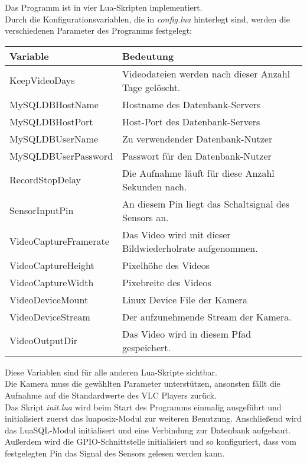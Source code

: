 Das Programm ist in vier Lua-Skripten implementiert.\\
Durch die Konfigurationsvariablen, die in \textit{config.lua} hinterlegt sind, werden die verschiedenen Parameter des Programms festgelegt:
\begin{center}
\begin{tabular}{|l|l|}
     \hline
     \textbf{Variable} & \textbf{Bedeutung} \\ \hline \hline
     KeepVideoDays & Videodateien werden nach dieser Anzahl Tage gel\"oscht.  \\ \hline
     MySQLDBHostName & Hostname des Datenbank-Servers \\ \hline
     MySQLDBHostPort & Host-Port des Datenbank-Servers \\ \hline
     MySQLDBUserName & Zu verwendender Datenbank-Nutzer \\ \hline
     MySQLDBUserPassword & Passwort f\"ur den Datenbank-Nutzer \\ \hline
     RecordStopDelay & Die Aufnahme l\"auft f\"ur diese Anzahl Sekunden nach. \\ \hline
     SensorInputPin & An diesem Pin liegt das Schaltsignal des Sensors an. \\ \hline
     VideoCaptureFramerate & Das Video wird mit dieser Bildwiederholrate aufgenommen. \\ \hline
     VideoCaptureHeight & Pixelh\"ohe des Videos \\ \hline
     VideoCaptureWidth & Pixebreite des Videos \\ \hline
     VideoDeviceMount & Linux Device File der Kamera \\ \hline
     VideoDeviceStream & Der aufzunehmende Stream der Kamera. \\ \hline
     VideoOutputDir & Das Video wird in diesem Pfad gespeichert. \\ \hline
\end{tabular}
\end{center}
Diese Variablen sind für alle anderen Lua-Skripte sichtbar.\\
Die Kamera muss die gew\"ahlten Parameter unterst\"utzen, ansonsten f\"allt die Aufnahme auf die Standardwerte des VLC Players zur\"uck.\\

Das Skript \textit{init.lua} wird beim Start des Programms einmalig ausgef\"uhrt und initialisiert zuerst das luaposix-Modul zur weiteren Benutzung. Anschlie{\ss}end wird das LuaSQL-Modul initialisert und eine Verbindung zur Datenbank aufgebaut. Au{\ss}erdem wird die GPIO-Schnittstelle initialisiert und so konfiguriert, dass vom festgelegten Pin das Signal des Sensors gelesen werden kann.\\

